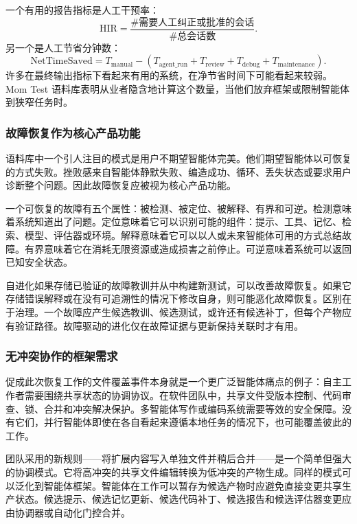 一个有用的报告指标是人工干预率：
\[
  \mathrm{HIR}=\frac{\#\text{需要人工纠正或批准的会话}}{\#\text{总会话数}}.
\]
另一个是人工节省分钟数：
\[
  \mathrm{NetTimeSaved}=T_{\mathrm{manual}}-(T_{\mathrm{agent\_run}}+T_{\mathrm{review}}+T_{\mathrm{debug}}+T_{\mathrm{maintenance}}).
\]
许多在最终输出指标下看起来有用的系统，在净节省时间下可能看起来较弱。Mom Test 语料库表明从业者隐含地计算这个数量，当他们放弃框架或限制智能体到狭窄任务时。

\subsubsection{故障恢复作为核心产品功能}
\label{sec:ch7-failure-recovery}

语料库中一个引人注目的模式是用户不期望智能体完美。他们期望智能体以可恢复的方式失败。挫败感来自智能体静默失败、编造成功、循环、丢失状态或要求用户诊断整个问题。因此故障恢复应被视为核心产品功能。

一个可恢复的故障有五个属性：被检测、被定位、被解释、有界和可逆。检测意味着系统知道出了问题。定位意味着它可以识别可能的组件：提示、工具、记忆、检索、模型、评估器或环境。解释意味着它可以以人或未来智能体可用的方式总结故障。有界意味着它在消耗无限资源或造成损害之前停止。可逆意味着系统可以返回已知安全状态。

自进化如果存储已验证的故障教训并从中构建新测试，可以改善故障恢复。如果它存储错误解释或在没有可追溯性的情况下修改自身，则可能恶化故障恢复。区别在于治理。一个故障应产生候选教训、候选测试，或许还有候选补丁，但每个产物应有验证路径。故障驱动的进化仅在故障证据与更新保持关联时才有用。

\subsubsection{无冲突协作的框架需求}
\label{sec:ch7-conflict-free-collaboration}

促成此次恢复工作的文件覆盖事件本身就是一个更广泛智能体痛点的例子：自主工作者需要围绕共享状态的协调协议。在软件团队中，共享文件受版本控制、代码审查、锁、合并和冲突解决保护。多智能体写作或编码系统需要等效的安全保障。没有它们，并行智能体即使在各自看起来遵循本地任务的情况下，也可能覆盖彼此的工作。

团队采用的新规则——将扩展内容写入单独文件并稍后合并——是一个简单但强大的协调模式。它将高冲突的共享文件编辑转换为低冲突的产物生成。同样的模式可以泛化到智能体框架。智能体在工作可以暂存为候选产物时应避免直接变更共享生产状态。候选提示、候选记忆更新、候选代码补丁、候选报告和候选评估器变更应由协调器或自动化门控合并。

